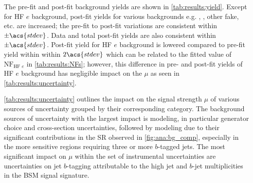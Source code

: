 \documentclass[../thesis.tex]{subfiles}
\begin{document}
The pre-fit and post-fit background yields are shown in \autoref{tab:results:yield}. Except for HF $e$ background, post-fit yields for various backgrounds e.g. \tttt, \ttH, other fake, etc. are increased; the pre-fit to post-fit variations are consistent within $\pm \acs{stdev}$. Data and total post-fit yields are also consistent within $\pm \acs{stdev}$. Post-fit yield for \acs{HF} $e$ background is lowered compared to pre-fit yield within within $2\acs{stdev}$ which can be related to the fitted value of $\text{NF}_{\text{HF }e}$ in \autoref{tab:results:NFs}; however, this difference in pre- and post-fit yields of HF $e$ background has negligible impact on the $\mu$ as seen in \autoref{tab:results:uncertainty}.

\autoref{tab:results:uncertainty} outlines the impact on the signal strength $\mu$ of various sources of uncertainty grouped by their corresponding category. The background sources of uncertainty with the largest impact is \tttt modeling, in particular \tttt generator choice and cross-section uncertainties, followed by \ttW modeling due to their significant contributions in the \acs{SR} observed in \autoref{fig:ana:bg_comp}, especially in the more sensitive regions requiring three or more $b$-tagged jets. The most significant impact on $\mu$ within the set of instrumental uncertainties are uncertainties on jet $b$-tagging attributable to the high jet and $b$-jet multiplicities in the \acs{BSM} \tttt signal signature.
\end{document}
